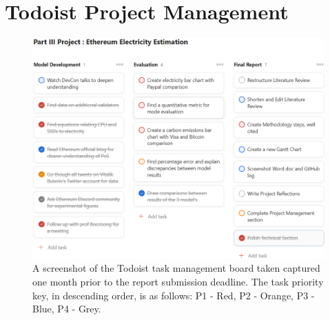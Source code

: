 \chapter{Todoist Project Management}


\begin{figure}[!htb]
    \includegraphics[width=18cm,center]{Figures/Todoist.png}
    \caption{A screenshot of the Todoist task management board taken captured one month prior to the report submission deadline. The task priority key, in descending order, is as follows: P1 - Red, P2 - Orange, P3 - Blue, P4 - Grey.}
    \label{Figure:Todoist}
\end{figure}